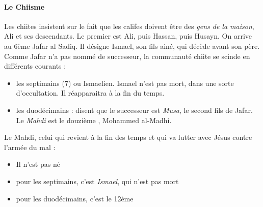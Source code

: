 \paragraph{Le Chiisme} Les chiites insistent sur le fait que les califes doivent être des \textit{gens de la maison}, Ali et ses descendants. Le premier \imam est Ali, puis Hassan, puis Husayn. On arrive au 6ème \imam Jafar al Sadiq. Il désigne Ismael, son fils ainé, qui décède avant son père. Comme Jafar n'a pas nommé de successeur, la communauté chiite se scinde en différents courants : 
\begin{itemize}
\item les septimains (7) ou Ismaelien. Ismael n'est pas mort, dans une sorte d'occultation. Il réapparaitra à la fin du temps.  
\item les duodécimains : disent que le successeur est \textit{Musa}, le second fils de Jafar. Le \textit{Mahdi} est le douzième \imam, Mohammed al-Madhi.
\end{itemize}

\begin{Def}[Mahdi]
Le Mahdi, celui qui revient à la fin des temps et qui va lutter avec Jésus contre l'armée du mal :
\begin{itemize}
\item Il n'est pas né
\item pour les septimains, c'est \textit{Ismael}, qui n'est pas mort
\item pour les duodécimains, c'est le 12ème \imam
\end{itemize}
\end{Def}
